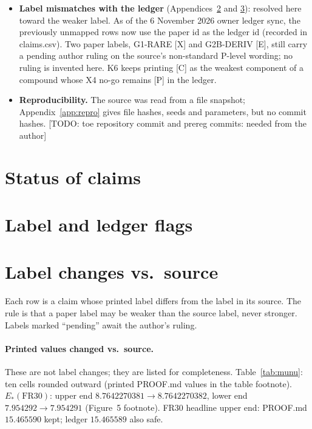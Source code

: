 \documentclass[11pt]{article}
\newcommand\todo[1]{{\color{red}\sffamily\small[TODO: #1]}}
\begin{document}
\begin{itemize}
\item \textbf{Label mismatches with the ledger} (Appendices~\ref{app:flags} and \ref{app:labelchanges}): resolved here toward the weaker label. As of the 6 November 2026 owner ledger sync, the previously unmapped rows now use the paper id as the ledger id (recorded in claims.csv). Two paper labels, G1-RARE [X] and G2B-DERIV [E], still carry a pending author ruling on the source's non-standard P-level wording; no ruling is invented here. K6 keeps printing [C] as the weakest component of a compound whose X4 no-go remains [P] in the ledger.
\item \textbf{Reproducibility.} The source was read from a file snapshot; Appendix~\ref{app:repro} gives file hashes, seeds and parameters, but no commit hashes. \todo{toe repository commit and prereg commits: needed from the author}
\end{itemize}

\appendix
\section{Status of claims}\label{app:claims}



\section{Label and ledger flags}\label{app:flags}


\section{Label changes vs.\ source}\label{app:labelchanges}
Each row is a claim whose printed label differs from the label in its source. The rule is that a paper label may be weaker than the source label, never stronger. Labels marked ``pending'' await the author's ruling.


\paragraph{Printed values changed vs.\ source.} These are not label changes; they are listed for completeness. Table~\ref{tab:munu}: ten cells rounded outward (printed PROOF.md values in the table footnote). $E_*(\mathrm{FR30})$: upper end $8.7642270381\to8.7642270382$, lower end $7.954292\to7.954291$ (Figure~5 footnote). FR30 headline upper end: PROOF.md $15.465590$ kept; ledger $15.465589$ also safe.
\end{document}
